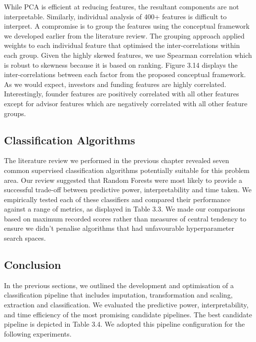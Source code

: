 \documentclass[../thesis/thesis.tex]{subfiles}
\begin{document}
While PCA is efficient at reducing features, the resultant components are not interpretable. Similarly, individual analysis of 400+ features is difficult to interpret. A compromise is to group the features using the conceptual framework we developed earlier from the literature review. The grouping approach applied weights to each individual feature that optimised the inter-correlations within each group. Given the highly skewed features, we use Spearman correlation which is robust to skewness because it is based on ranking. Figure 3.14 displays the inter-correlations between each factor from the proposed conceptual framework. As we would expect, investors and funding features are highly correlated. Interestingly, founder features are positively correlated with all other features except for advisor features which are negatively correlated with all other feature groups.

\subsection{Classification Algorithms}

The literature review we performed in the previous chapter revealed seven common supervised classification algorithms potentially suitable for this problem area. Our review suggested that Random Forests were most likely to provide a successful trade-off between predictive power, interpretability and time taken. We empirically tested each of these classifiers and compared their performance against a range of metrics, as displayed in Table 3.3. We made our comparisons based on maximum recorded scores rather than measures of central tendency to ensure we didn’t penalise algorithms that had unfavourable hyperparameter search spaces.

\subsection{Conclusion}

In the previous sections, we outlined the development and optimisation of a classification pipeline that includes imputation, transformation and scaling, extraction and classification. We evaluated the predictive power, interpretability, and time efficiency of the most promising candidate pipelines. The best candidate pipeline is depicted in Table 3.4. We adopted this pipeline configuration for the following experiments.

\end{document}
